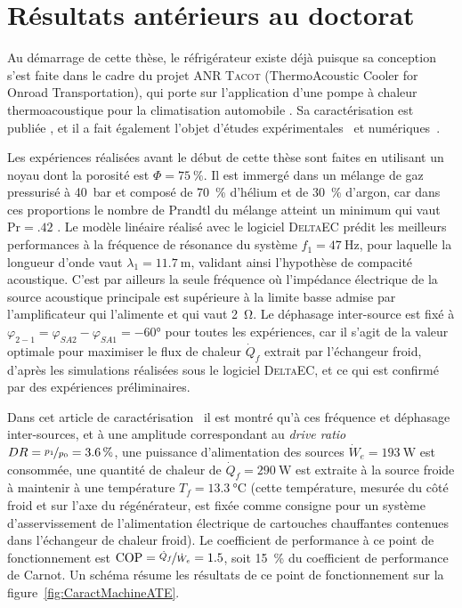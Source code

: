 \section{Résultats antérieurs au doctorat}\label{chap:PresTacot_ResultatsATE}
Au démarrage de cette thèse, le réfrigérateur existe déjà puisque sa conception s'est faite dans le cadre du projet ANR \textsc{Tacot} (ThermoAcoustic Cooler for Onroad Transportation), qui porte sur l'application d'une pompe à chaleur thermoacoustique pour la climatisation automobile \cite{ANR_thermo-acoustic_2019}. Sa caractérisation est publiée \cite{ramadan_design_2021}, et il a fait également l'objet d'études expérimentales~\cite{ramadan_experimental_2018, ramadan_experimental_2021, poignand_test-bench_2022} et  numériques~\cite{hireche_experimental_2020, baltean_gravity_2025}.\smallskip

Les expériences réalisées avant le début de cette thèse sont faites en utilisant un noyau dont la porosité est $\Phi=\qty{75}{\percent}$. Il est immergé dans un mélange de gaz pressurisé à \qty{40}{\bar} et composé de \qty{70}{\percent} d'hélium et de \qty{30}{\percent} d'argon, car dans ces proportions le nombre de Prandtl du mélange atteint un minimum qui vaut $\mathrm{Pr} = \num{.42}$ \cite{belcher_working_1999}. Le modèle linéaire réalisé avec le logiciel \textsc{DeltaEC} prédit les meilleurs performances à la fréquence de résonance du système $f_1=\qty{47}{\hertz}$, pour laquelle la longueur d'onde vaut $\lambda_1=\qty{11.7}{\meter}$, validant ainsi l'hypothèse de compacité acoustique. C'est par ailleurs la seule fréquence où l'impédance électrique de la source acoustique principale est supérieure à la limite basse admise par l'amplificateur qui l'alimente et qui vaut \qty{2}{\ohm}. Le déphasage inter-source est fixé à $\varphi_{2-1}=\varphi_{SA2} - \varphi_{SA1}=\ang{-60}$ pour toutes les expériences, car il s'agit de la valeur optimale pour maximiser le flux de chaleur $\dot Q_f$ extrait par l'échangeur froid, d'après les simulations réalisées sous le logiciel \textsc{DeltaEC}, et ce qui est confirmé par des expériences préliminaires.\smallskip

Dans cet article de caractérisation~\cite{ramadan_design_2021} il est montré qu'à ces fréquence et déphasage inter-sources, et à une amplitude correspondant au \textit{drive ratio} $DR=\nicefrac{p_1}{p_0}=\qty{3.6}{\percent}$, une puissance d'alimentation des sources $\dot W_e=\qty{193}{\watt}$ est consommée, une quantité de chaleur de $\dot Q_f=\qty{290}{\watt}$ est extraite à la source froide à maintenir à une température $T_f=\qty{13.3}{\degreeCelsius}$ (cette température, mesurée du côté froid et sur l'axe du régénérateur, est fixée comme consigne pour un système d'asservissement de l'alimentation électrique de cartouches chauffantes contenues dans l'échangeur de chaleur froid). Le coefficient de performance à ce point de fonctionnement est $\mathrm{COP}=\nicefrac{\dot Q_f}{\dot W_e}=\num{1.5}$, soit \qty{15}{\percent} du coefficient de performance de Carnot. Un schéma résume les résultats de ce point de fonctionnement sur la figure~\ref{fig:CaractMachineATE}.\medskip

